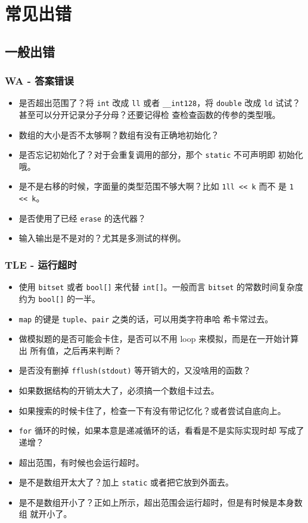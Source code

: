 \chapter{常见出错}
\section{一般出错}
\subsection{WA - 答案错误}
\begin{itemize}
    \item 是否超出范围了？将 \verb|int| 改成 \verb|ll| 或者 \verb|__int128|，将
        \verb|double| 改成 \verb|ld| 试试？甚至可以分开记录分子分母？还要记得检
        查检查函数的传参的类型哦。
    \item 数组的大小是否不太够啊？数组有没有正确地初始化？
    \item 是否忘记初始化了？对于会重复调用的部分，那个 \verb|static| 不可声明即
        初始化哦。
    \item 是不是右移的时候，字面量的类型范围不够大啊？比如 \verb|1ll << k| 而不
        是 \verb|1 << k|。
    \item 是否使用了已经 \verb|erase| 的迭代器？
    \item 输入输出是不是对的？尤其是多测试的样例。
\end{itemize}

\subsection{TLE - 运行超时}
\begin{itemize}
    \item 使用 \verb|bitset| 或者 \verb|bool[]| 来代替 \verb|int[]|。一般而言
        \verb|bitset| 的常数时间复杂度约为 \verb|bool[]| 的一半。
    \item \verb|map| 的键是 \verb|tuple|、\verb|pair| 之类的话，可以用类字符串哈
        希卡常过去。
    \item 做模拟题的是否可能会卡住，是否可以不用 loop 来模拟，而是在一开始计算出
        所有值，之后再来判断？
    \item 是否没有删掉 \verb|fflush(stdout)| 等开销大的，又没啥用的函数？
    \item 如果数据结构的开销太大了，必须搞一个数组卡过去。
    \item 如果搜索的时候卡住了，检查一下有没有带记忆化？或者尝试自底向上。
    \item \verb|for| 循环的时候，如果本意是递减循环的话，看看是不是实际实现时却
        写成了递增？
    \item 超出范围，有时候也会运行超时。
    \item 是不是数组开太大了？加上 \verb|static| 或者把它放到外面去。
    \item 是不是数组开小了？正如上所示，超出范围会运行超时，但是有时候是本身数组
        就开小了。
\end{itemize}


